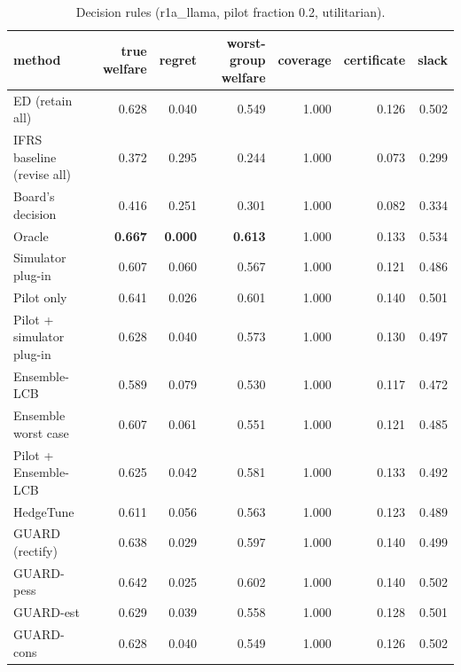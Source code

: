 \begin{table}[t]
\centering
\small
\begin{tabular}{lrrrrrr}
\toprule
method & true welfare & regret & worst-group welfare & coverage & certificate & slack \\
\midrule
ED (retain all) & 0.628 & 0.040 & 0.549 & 1.000 & 0.126 & 0.502 \\
IFRS baseline (revise all) & 0.372 & 0.295 & 0.244 & 1.000 & 0.073 & 0.299 \\
Board's decision & 0.416 & 0.251 & 0.301 & 1.000 & 0.082 & 0.334 \\
Oracle & \textbf{0.667} & \textbf{0.000} & \textbf{0.613} & 1.000 & 0.133 & 0.534 \\
Simulator plug-in & 0.607 & 0.060 & 0.567 & 1.000 & 0.121 & 0.486 \\
Pilot only & 0.641 & 0.026 & 0.601 & 1.000 & 0.140 & 0.501 \\
Pilot + simulator plug-in & 0.628 & 0.040 & 0.573 & 1.000 & 0.130 & 0.497 \\
Ensemble-LCB & 0.589 & 0.079 & 0.530 & 1.000 & 0.117 & 0.472 \\
Ensemble worst case & 0.607 & 0.061 & 0.551 & 1.000 & 0.121 & 0.485 \\
Pilot + Ensemble-LCB & 0.625 & 0.042 & 0.581 & 1.000 & 0.133 & 0.492 \\
HedgeTune & 0.611 & 0.056 & 0.563 & 1.000 & 0.123 & 0.489 \\
GUARD (rectify) & 0.638 & 0.029 & 0.597 & 1.000 & 0.140 & 0.499 \\
GUARD-pess & 0.642 & 0.025 & 0.602 & 1.000 & 0.140 & 0.502 \\
GUARD-est & 0.629 & 0.039 & 0.558 & 1.000 & 0.128 & 0.501 \\
GUARD-cons & 0.628 & 0.040 & 0.549 & 1.000 & 0.126 & 0.502 \\
\bottomrule
\end{tabular}
\caption{Decision rules (r1a\_llama, pilot fraction 0.2, utilitarian).}
\label{tab:methods-utilitarian}
\end{table}
